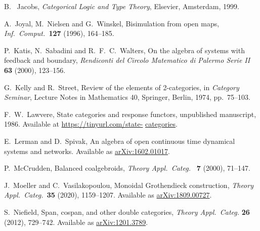 \documentclass[reqno]{amsart}
\begin{document}
\begin{thebibliography}{100}
 B. \ Jacobs, \textsl{Categorical Logic and Type Theory}, Elsevier, Amsterdam, 1999.

 A.\ Joyal, M.\ Nielsen and G.\ Winskel, Bisimulation from open maps, \textsl{Inf.\ Comput.\ }\textbf{127} (1996), 164--185.

 P.\ Katis, N.\ Sabadini and R.\ F.\ C.\ Walters, On the algebra of systems with feedback and boundary, \textsl{Rendiconti del Circolo Matematico di Palermo Serie II} \textbf{63} (2000), 123--156.

 G.\ Kelly and R.\ Street, Review of the elements of 2-categories, in \textsl{Category Seminar}, Lecture Notes in Mathematics 40, Springer, Berlin, 1974, 
pp.\ 75--103.

 F.\ W.\ Lawvere, State categories and response functors, unpublished manuscript, 1986.  Available at \href{https://tinyurl.com/state}{https://tinyurl.com/state-}  \href{https://tinyurl.com/state-categories}{categories}.

 E.\ Lerman and D.\ Spivak, An algebra of open continuous time dynamical systems and networks. Available as \href{http://arxiv.org/abs/1602.01017}{arXiv:1602.01017}.




 P.\ McCrudden, Balanced coalgebroids, \textsl{Theory Appl.\ Categ.\ } \textbf{7} (2000), 71--147.

 J.\ Moeller and C.\ Vasilakopoulou, Monoidal Grothendieck construction, \textsl{Theory Appl.\ Categ.\ }\textbf{35} (2020), 1159--1207. Available as \href{https://arxiv.org/abs/1809.00727}{arXiv:1809.00727}.

 S.~Niefield, Span, cospan, and other double categories, \textsl{Theory Appl.\ Categ.} \textbf{26} (2012), 729--742. Available as \href{https://arxiv.org/abs/1201.3789}{arXiv:1201.3789}.


\end{thebibliography}
\end{document}
